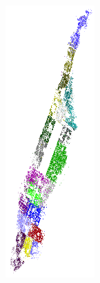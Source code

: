 \documentclass[12pt]{beamer}
\begin{document}
\begin{frame}[t]
\begin{columns}
\begin{figure}[t!]
\begin{center}
\includegraphics[width=0.5\textwidth]{imgs/police.png}

\end{center}
\end{figure}
\end{columns}
\end{frame}
\end{document}
